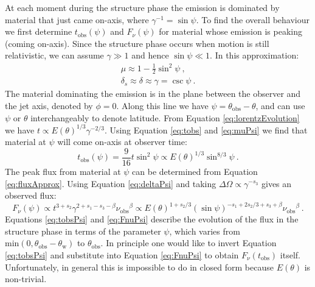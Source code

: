 \documentclass[modern]{aastex62}
\newcommand{\tobs}{\ensuremath{t_{\mathrm{obs}}}}
\newcommand{\nuobs}{\ensuremath{\nu_{\mathrm{obs}}}}
\newcommand{\thobs}{\ensuremath{\theta_{\mathrm{obs}}}}
\newcommand{\thW}{\ensuremath{\theta_{\mathrm{w}}}}
\begin{document}
At each moment during the structure phase the emission is dominated by material that just came on-axis, where $\gamma^{-1} = \sin \psi$.  To find the overall behaviour we first determine $\tobs(\psi)$ and $F_\nu(\psi)$ for material whose emission is peaking (coming on-axis).  Since the structure phase occurs when motion is still relativistic, we can assume $\gamma \gg 1$ and hence $\sin \psi \ll 1$.  In this approximation:
\begin{eqnarray}
	\mu \approx 1 - \frac{1}{2}\sin^2\psi \ , \label{eq:muPsi}\\
	\delta_s \approx \delta \approx \gamma = \csc \psi\ . \label{eq:deltaPsi}
\end{eqnarray}
The material dominating the emission is in the plane between the observer and the jet axis, denoted by $\phi = 0$. Along this line we have $\psi = \thobs - \theta$, and can use $\psi$ or $\theta$ interchangeably to denote latitude.  From Equation \eqref{eq:lorentzEvolution} we have $t\propto E(\theta)^{1/3} \gamma^{-2/3}$.  Using Equation \eqref{eq:tobs} and \eqref{eq:muPsi} we find that material at $\psi$ will come on-axis at observer time:
\begin{equation}
	\tobs(\psi) = \frac{9}{16} t \sin^2\psi  \propto E(\theta)^{1/3} \sin^{8/3} \psi\ . \label{eq:tobsPsi}
\end{equation}
The peak flux from material at $\psi$ can be determined from Equation \eqref{eq:fluxApprox}.  Using Equation \eqref{eq:deltaPsi} and taking $\Delta \Omega \propto \gamma^{-s_3}$ gives an observed flux:
\begin{equation}
	F_\nu(\psi) \propto t^{3+s_2} \gamma^{2+s_1-s_3-\beta} \nuobs^\beta \propto E(\theta)^{1+s_2/3} (\sin \psi)^{-s_1 + 2 s_2/3 +s_3+\beta} \nuobs^\beta  \ . \label{eq:FnuPsi}
\end{equation}
	Equations \eqref{eq:tobsPsi} and \eqref{eq:FnuPsi} describe the evolution of the flux in the structure phase in terms of the parameter $\psi$, which varies from $\mathrm{min} (0, \thobs-\thW)$ to $\thobs$.  In principle one would like to invert Equation \eqref{eq:tobsPsi} and substitute into Equation \eqref{eq:FnuPsi} to obtain $F_\nu(\tobs)$ itself.  Unfortunately, in general this is impossible to do in closed form because $E(\theta)$ is non-trivial. 
	
\end{document}
